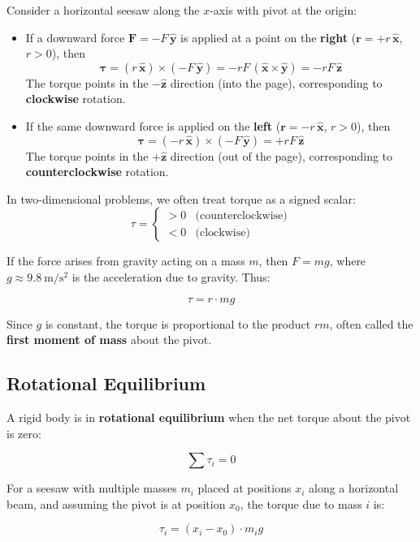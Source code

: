 \documentclass{article}
\begin{document}
Consider a horizontal seesaw along the $x$-axis with pivot at the origin:
\begin{itemize}
\item If a downward force $\mathbf{F} = -F\,\hat{\mathbf{y}}$ is applied at a point on the \textbf{right} ($\mathbf{r} = +r\,\hat{\mathbf{x}}$, $r > 0$), then
    \[
    \boldsymbol{\tau} = (r\,\hat{\mathbf{x}}) \times (-F\,\hat{\mathbf{y}}) = -rF\,(\hat{\mathbf{x}} \times \hat{\mathbf{y}}) = -rF\,\hat{\mathbf{z}}
    \]
    The torque points in the $-\hat{\mathbf{z}}$ direction (into the page), corresponding to \textbf{clockwise} rotation.

    \item If the same downward force is applied on the \textbf{left} ($\mathbf{r} = -r\,\hat{\mathbf{x}}$, $r > 0$), then
    \[
    \boldsymbol{\tau} = (-r\,\hat{\mathbf{x}}) \times (-F\,\hat{\mathbf{y}}) = +rF\,\hat{\mathbf{z}}
    \]
    The torque points in the $+\hat{\mathbf{z}}$ direction (out of the page), corresponding to \textbf{counterclockwise} rotation.
\end{itemize}

In two-dimensional problems, we often treat torque as a signed scalar:
\[
\tau = 
\begin{cases}
> 0 & \text{(counterclockwise)} \\
< 0 & \text{(clockwise)}
\end{cases}
\]


If the force arises from gravity acting on a mass $m$, then $F = mg$, where $g \approx \SI{9.8}{\meter\per\second\squared}$ is the acceleration due to gravity. Thus:

\[
\tau = r \cdot mg
\]

Since $g$ is constant, the torque is proportional to the product $r m$, often called the \textbf{first moment of mass} about the pivot.

\subsection{Rotational Equilibrium}

A rigid body is in \textbf{rotational equilibrium} when the net torque about the pivot is zero:

\[
\sum \tau_i = 0
\]

For a seesaw with multiple masses $m_i$ placed at positions $x_i$ along a horizontal beam, and assuming the pivot is at position $x_0$, the torque due to mass $i$ is:

\[
\tau_i = (x_i - x_0) \cdot m_i g
\]
\end{document}
